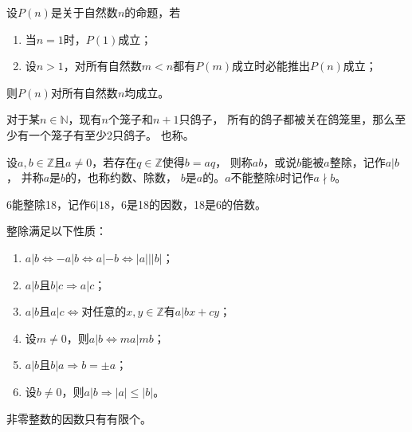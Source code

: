 \begin{theorem}
    设$P(n)$是关于自然数$n$的命题，若
    \begin{enumerate}
        \item 当$n=1$时，$P(1)$成立；
        \item 设$n>1$，对所有自然数$m<n$都有$P(m)$成立时必能推出$P(n)$成立；
    \end{enumerate}
    则$P(n)$对所有自然数$n$均成立。
\end{theorem}

\begin{theorem}
    对于某$n\in\mathbb{N}$，现有$n$个笼子和$n+1$只鸽子，
    所有的鸽子都被关在鸽笼里，那么至少有一个笼子有至少2只鸽子。
    也称。
\end{theorem}

\begin{definition}
    设$a,b\in\mathbb{Z}$且$a\neq0$，若存在$q\in\mathbb{Z}$使得$b=aq$，
    则称$a$$b$，或说$b$能被$a$整除，记作$a|b$，
    并称$a$是$b$的，也称{\sffamily 约数}、{\sffamily 除数}，
    $b$是$a$的。$a$不能整除$b$时记作$a\nmid b$。
\end{definition}

\begin{example}
    6能整除18，记作$6|18$，6是18的因数，18是6的倍数。
\end{example}

\begin{theorem}
    整除满足以下性质：
    \begin{enumerate}
        \item $a|b\Leftrightarrow -a|b \Leftrightarrow a|-b \Leftrightarrow |a|||b|$；
        \item $a|b$且$b|c \Rightarrow a|c$；
        \item $a|b$且$a|c \Leftrightarrow$对任意的$x,y\in\mathbb{Z}$有$a|bx+cy$；
        \item 设$m\neq0$，则$a|b\Leftrightarrow ma|mb$；
        \item $a|b$且$b|a\Rightarrow b=\pm a$；
        \item 设$b\neq0$，则$a|b\Rightarrow |a|\le|b|$。
    \end{enumerate}
\end{theorem}

\begin{corollary}
    非零整数的因数只有有限个。
\end{corollary}

